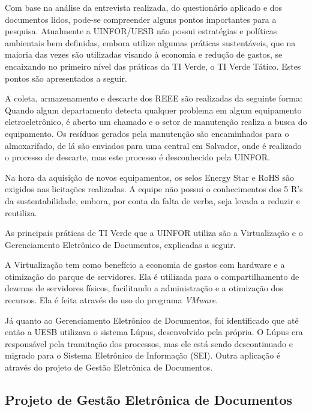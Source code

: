 Com base na análise da entrevista realizada, do questionário aplicado e dos documentos lidos, pode-se compreender alguns pontos importantes para a pesquisa. Atualmente a UINFOR/UESB não possui estratégias e políticas ambientais bem definidas, embora utilize algumas práticas sustentáveis, que na maioria das vezes são utilizadas visando à economia e redução de gastos, se encaixando no primeiro nível das práticas da TI Verde, o TI Verde Tático. Estes pontos são apresentados a seguir. 

A coleta, armazenamento e descarte dos REEE são realizadas da seguinte forma: Quando algum departamento detecta qualquer problema em algum equipamento eletroeletrônico, é aberto um chamado e o setor de manutenção realiza a busca do equipamento. Os resíduos gerados pela manutenção são encaminhados para o almoxarifado, de lá são enviados para uma central em Salvador, onde é realizado o processo de descarte, mas este processo é desconhecido pela UINFOR.

Na hora da aquisição de novos equipamentos, os selos Energy Star e RoHS são exigidos nas licitações realizadas. A equipe não possui o conhecimentos dos 5 R's da sustentabilidade, embora, por conta da falta de verba, seja levada a reduzir e reutiliza.


As principais práticas de TI Verde que a UINFOR utiliza são a Virtualização e o Gerenciamento Eletrônico de Documentos, explicadas a seguir.

A Virtualização tem como benefício a economia de gastos com hardware e a otimização do parque de servidores. Ela é utilizada para o compartilhamento de dezenas de servidores físicos, facilitando a administração e a otimização dos recursos. Ela é feita através do uso do programa \textit{VMware}. 

Já quanto ao Gerenciamento Eletrônico de Documentos, foi identificado que até então a UESB utilizava o sistema Lúpus, desenvolvido pela própria. O Lúpus era responsável pela tramitação dos processos, mas ele está sendo descontinuado e migrado para o Sistema Eletrônico de Informação (SEI). Outra aplicação é através do projeto de Gestão Eletrônica de Documentos.

\subsection{Projeto de Gestão Eletrônica de Documentos}

